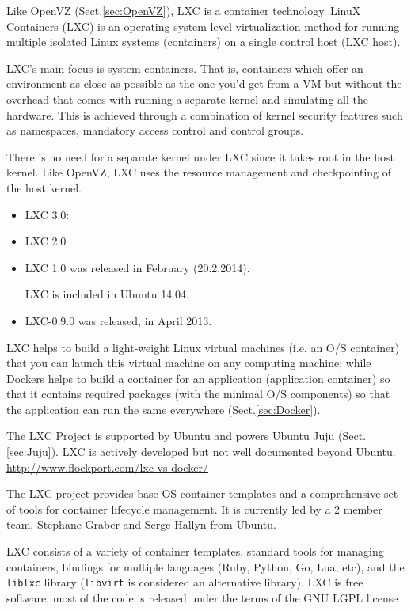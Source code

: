Like OpenVZ (Sect.\ref{sec:OpenVZ}), LXC is a container technology.
LinuX Containers (LXC) is an operating system-level virtualization method for
running multiple isolated Linux systems (containers) on a single control host
(LXC host).

LXC's main focus is system containers. That is, containers which offer an
environment as close as possible as the one you'd get from a VM but without the
overhead that comes with running a separate kernel and simulating all the
hardware. This is achieved through a combination of kernel security features
such as namespaces, mandatory access control and control groups.



There is no need for a separate kernel under LXC since it takes root
in the host kernel. Like OpenVZ, LXC uses the resource management and
checkpointing of the host kernel. 

\begin{itemize}
 
  \item LXC 3.0: 
  
  \item LXC 2.0
   
  \item LXC 1.0 was released in February (20.2.2014).
  
  
LXC is included in Ubuntu 14.04.

  \item  LXC-0.9.0 was released, in April 2013.
  
 \end{itemize}

LXC helps to build a light-weight Linux virtual machines (i.e. an O/S container)
that you can launch this virtual machine on any computing machine; while Dockers
helps to build a container for an application (application container) so that it
contains required packages (with the minimal O/S components) so that the
application can run the same everywhere (Sect.\ref{sec:Docker}).

The LXC Project is supported by Ubuntu and powers Ubuntu Juju
(Sect.\ref{sec:Juju}). LXC is actively developed but not well documented beyond
Ubuntu. \url{http://www.flockport.com/lxc-vs-docker/}

The LXC project provides base OS container templates and a comprehensive set of tools for
container lifecycle management. It is currently led by a 2 member team, Stephane
Graber and Serge Hallyn from Ubuntu.   

LXC consists of a variety of container templates, standard tools for managing
containers, bindings for multiple languages (Ruby, Python, Go, Lua, etc), and
the \verb!liblxc! library (\verb!libvirt! is considered an alternative library).
LXC is free software, most of the code is released under the terms of the GNU
LGPL license

